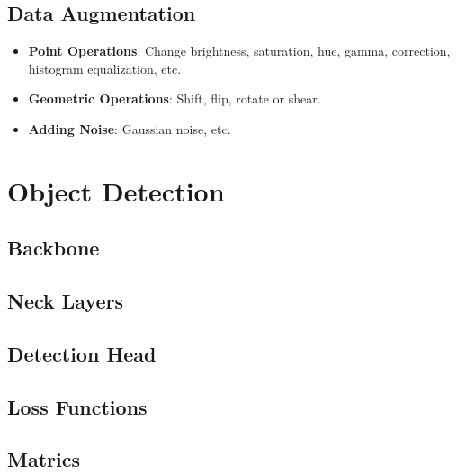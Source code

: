 \documentclass[a4paper]{article}
\begin{document}
\subsection{Data Augmentation}

\begin{itemize}
	\item \textbf{Point Operations}: Change brightness, saturation, hue, gamma, correction, histogram equalization, etc.
	\item \textbf{Geometric Operations}: Shift, flip, rotate or shear.
	\item \textbf{Adding Noise}: Gaussian noise, etc.
\end{itemize}

\section{Object Detection}

\subsection{Backbone}

\subsection{Neck Layers}

\subsection{Detection Head}

\subsection{Loss Functions}

\subsection{Matrics}
\end{document}
